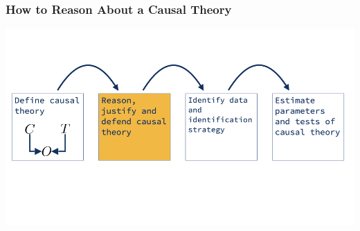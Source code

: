 \documentclass[12pt, block=fill]{beamer}
\begin{document}
\begin{frame}
  \frametitle{How to Reason About a Causal Theory}
  \centering
  \includegraphics[width = \textwidth]{images/explanatory_workflow/explanatory_workflow_003.png}
\end{frame} 

% 
%  
%
%  
\end{document}
